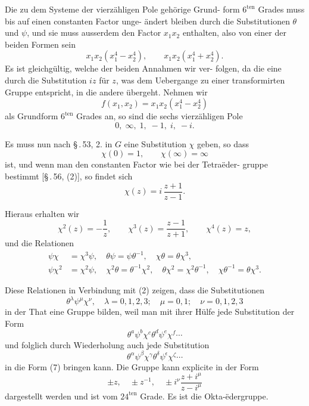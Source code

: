 \documentclass[12pt,a4paper]{article}
\theoremstyle{plain}
\theoremstyle{definition}
\theoremstyle{remark}
\begin{document}
Die zu dem Systeme der vierz\"ahligen Pole geh\"orige Grund-
form $6^{\text{ten}}$ Grades muss bis auf einen constanten Factor unge-
\"andert bleiben durch die Substitutionen $\theta$ und $\psi$, und sie muss
ausserdem den Factor $x_1 x_2$ enthalten, also von einer der beiden
Formen sein
\[
x_1 x_2 (x_1^4 - x_2^4),\qquad x_1 x_2 (x_1^4 + x_2^4).
\]
Es ist gleichg\"ultig, welche der beiden Annahmen wir ver-
folgen, da die eine durch die Substitution $iz$ f\"ur $z$, was dem
Uebergange zu einer transformirten Gruppe entspricht, in die
andere \"ubergeht. Nehmen wir
\begin{equation}\label{eq:57_3}
f(x_1, x_2) = x_1 x_2 (x_1^4 - x_2^4)\tag{3}
\end{equation}
als Grundform $6^{\text{ten}}$ Grades an, so sind die sechs vierz\"ahligen Pole
\begin{equation}\label{eq:57_4}
0,\; \infty,\; 1,\; -1,\; i,\; -i.\tag{4}
\end{equation}

Es muss nun nach \S\,.\,53, 2. in $G$ eine Substitution $\chi$ geben,
so dass
\[
\chi(0) = 1,\qquad \chi(\infty) = \infty
\]
ist, und wenn man den constanten Factor wie bei der Tetra\"eder-
gruppe bestimmt [\S\,.\,56, (2)], so findet sich
\begin{equation}\label{eq:57_5}
\chi(z) = i\,\frac{z+1}{z-1}.\tag{5}
\end{equation}

Hieraus erhalten wir
\[
\chi^2(z) = -\frac{1}{z},\qquad \chi^3(z) = \frac{z-1}{z+1},\qquad \chi^4(z) = z,
\]
und die Relationen
\begin{equation}\label{eq:57_6}
\begin{aligned}
\psi\chi &= \chi^3\psi,\quad \theta\psi = \psi\theta^{-1},\quad \chi\theta = \theta\chi^3,\\
\psi\chi^2 &= \chi^2\psi,\quad \chi^2\theta = \theta^{-1}\chi^2,\quad \theta\chi^2 = \chi^2\theta^{-1},\quad \chi\theta^{-1} = \theta\chi^3.
\end{aligned}\tag{6}
\end{equation}

Diese Relationen in Verbindung mit (2) zeigen, dass die
Substitutionen
\begin{equation}\label{eq:57_7}
\theta^\lambda \psi^\mu \chi^\nu,\quad \lambda = 0, 1, 2, 3;\quad \mu = 0, 1;\quad \nu = 0, 1, 2, 3\tag{7}
\end{equation}
in der That eine Gruppe bilden, weil man mit ihrer H\"ulfe jede
Substitution der Form
\[
\theta^a \psi^b \chi^c \theta^d \psi^e \chi^f \cdots
\]
und folglich durch Wiederholung auch jede Substitution
\[
\theta^\alpha \psi^\beta \chi^\gamma \theta^\delta \psi^\epsilon \chi^\zeta \cdots
\]
in die Form (7) bringen kann. Die Gruppe kann explicite in
der Form
\[
\pm z,\quad \pm z^{-1},\quad \pm i^\nu \frac{z+i^\mu}{z-i^\mu}
\]
dargestellt werden und ist vom $24^{\text{ten}}$ Grade. Es ist die Okta-\"edergruppe.
\end{document}
